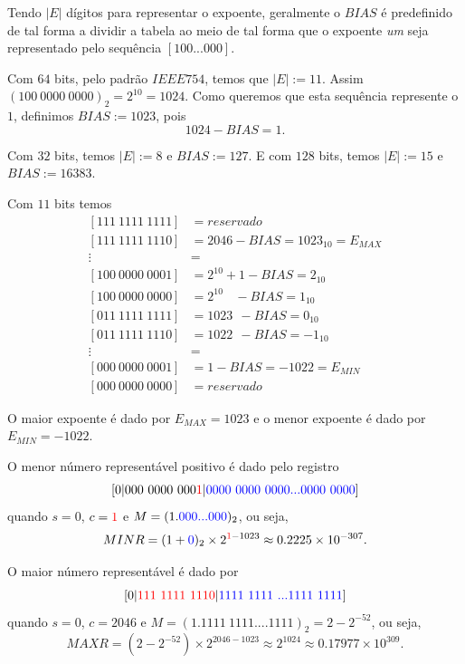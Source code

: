 Tendo $|E|$ dígitos para representar o expoente, geralmente o $BIAS$ é predefinido de tal forma a dividir a tabela ao meio de tal forma que o expoente \textit{um} seja representado pelo sequência $[100...000]$. 

\begin{ex}
Com $64$ bits, pelo padrão $IEEE754$, temos que $|E|:=11$. Assim $(100~0000~0000)_2=2^{10}=1024$. Como queremos que esta sequência represente o $1$, definimos $BIAS:=1023$, pois
$$ 1024-BIAS=1.$$

Com $32$ bits, temos $|E|:=8$ e $BIAS:=127$. E com $128$ bits, temos $|E|:=15$ e $BIAS:=16383$.
\end{ex}


Com $11$ bits temos 
\begin{equation*}
  \begin{split}
 [111~1111~1111] &= reservado\\
 [111~1111~1110] &= 2046-BIAS      = 1023_{10}= E_{MAX}\\
     \vdots      &=  \\
 [100~0000~0001] &= 2^{10}+1  -BIAS =  2_{10} \\
 [100~0000~0000] &= 2^{10}~~~~-BIAS =  1_{10} \\
 [011~1111~1111] &= 1023   ~~ -BIAS =  0_{10} \\
 [011~1111~1110] &= 1022   ~~ -BIAS = -1_{10} \\
     \vdots      &=  \\
 [000~0000~0001] &= 1-BIAS = -1022 = E_{MIN}\\
 [000~0000~0000] &= reservado    
  \end{split}
\end{equation*}

O maior expoente é dado por $E_{MAX}=1023$ e o menor expoente é dado por $E_{MIN}=-1022$.



O menor número representável positivo é dado pelo registro
$$
[0|000~0000~000{\color{red}{1}} |{\color{blue}{0000~0000~0000...0000~0000}}]
$$
quando $s=0$, $c={\color{red}{1}}$ e $M=(1.{\color{blue}{000...000}})_2$, ou seja,
$$
MINR=(1+{\color{blue}{0}})_2\times 2^{{\color{red}{1}}-1023} \approx 0.2225\times 10^{-307}.
$$

O maior número representável é dado por
$$
[0|{\color{red}{111~1111~1110}} |{\color{blue}{1111~1111~...1111~1111}}]
$$
quando $s=0$, $c=2046$ e $M=(1.1111~1111....1111)_2=2-2^{-52}$, ou seja,
$$
MAXR=(2-2^{-52})\times 2^{2046-1023} \approx 2^{1024}\approx0.17977\times 10^{309}.
$$


